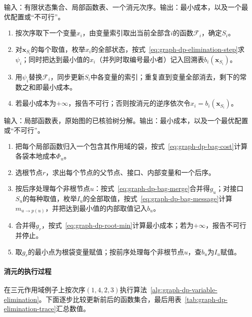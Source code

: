 \begin{algorithm}[变量消元求最小成本]
\label{alg:graph-dp-variable-elimination}
输入：有限状态集合、局部函数表、一个消元次序。输出：最小成本，以及一个最优配置或“不可行”。
\begin{enumerate}
  \item 按次序取下一个变量$x_i$，由变量索引取出当前全部含$i$的函数$\mathcal F_i$，确定$S_i$。
  \item 对$\bm x_{S_i}$的每个取值，枚举$x_i$的全部状态，按式~\eqref{eq:graph-dp-elimination-step}求$\psi_i$；同时把达到最小值的$x_i$（并列时取编号最小者）记入回溯表$b_i(\bm x_{S_i})$。
  \item 用$\psi_i$替换$\mathcal F_i$，同步更新$S_i$中各变量的索引；重复直到变量全部消去，剩下的常数之和即最小成本。
  \item 若最小成本为$+\infty$，报告不可行；否则按消元的逆序依次令$x_i=b_i(\bm x_{S_i})$。
\end{enumerate}
\end{algorithm}

\begin{algorithm}[树分解上的最小成本动态规划]
\label{alg:graph-dp-bag-dp}
输入：局部函数表，原始图的已核验树分解。输出：最小成本，以及一个最优配置或“不可行”。
\begin{enumerate}
  \item 把每个局部函数归入一个包含其作用域的袋，按式~\eqref{eq:graph-dp-bag-cost}计算各袋本地成本$\Phi_u$。
  \item 选根节点$r$，求出每个节点的父节点、接口、内部变量和一个后序。
  \item 按后序处理每个非根节点$u$：按式~\eqref{eq:graph-dp-bag-merge}合并得$g_u$；对接口$S_u$的每种取值，枚举$I_u$的全部取值，按式~\eqref{eq:graph-dp-bag-message}计算$m_{u\to p(u)}$，并把达到最小值的内部取值记入$b_u$。
  \item 合并得$g_r$，按式~\eqref{eq:graph-dp-root-min}计算最小成本；若为$+\infty$，报告不可行并停止。
  \item 取$g_r$的最小点为根袋变量赋值；按前序处理每个非根节点$u$，查$b_u$为$I_u$赋值。
\end{enumerate}
\end{algorithm}

\paragraph{消元的执行过程}
在三元作用域例子上按次序$(1,4,2,3)$执行算法~\ref{alg:graph-dp-variable-elimination}。下面逐步比较更新前后的函数集合，最后用表~\ref{tab:graph-dp-elimination-trace}汇总数值。

